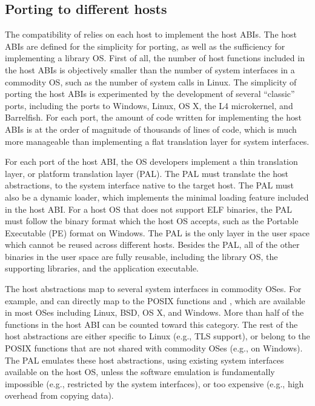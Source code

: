 \subsection{Porting to different hosts}
\label{sec:overview:host:porting}


The compatibility of \graphene{} relies on each host to implement the host ABIs.
The host ABIs are defined for the simplicity for porting, as well as the sufficiency for implementing a library OS.
First of all, the number of host functions included in the host ABIs
is objectively smaller than the number of system interfaces in a commodity OS, such as  the number of system calls in Linux. 
The simplicity of porting the host ABIs is experimented by the development of
several ``classic'' ports, including the ports to Windows, Linux, OS X,
the L4 microkernel, and Barrelfish.
For each port, the amount of code written for implementing the host ABIs is at the order of magnitude of thousands of lines of code, which is much more manageable than implementing a flat translation layer for system interfaces.


For each port of the host ABI, the OS developers implement a thin translation layer,
or platform translation layer (PAL). The PAL must translate the host abstractions, to the system interface native to the target host. 
The PAL must also be a dynamic loader, which implements the minimal loading feature included in the host ABI.
For a host OS that does not support ELF binaries, the PAL must follow the binary format which the host OS accepts, such as the Portable Executable (PE) format on Windows.
The PAL is the only layer in the user space which cannot be reused
across different hosts. Besides the PAL, all of the other binaries in the user space are fully reusable, including the library OS, the supporting libraries, and the application executable.



The host abstractions map to several system interfaces in commodity OSes.
For example,  and  can directly map to the POSIX functions  and , which are available in most OSes including Linux, BSD, OS X, and Windows.
More than half of the functions in the host ABI can be counted toward this category.
The rest of the host abstractions are either specific to Linux
(e.g., TLS support),
or belong to the POSIX functions that are not shared with commodity OSes
(e.g.,  on Windows).
The PAL emulates these host abstractions, using existing system interfaces available on the host OS, unless the software emulation is fundamentally impossible (e.g., restricted by the system interfaces), or too expensive (e.g., high overhead from copying data).





